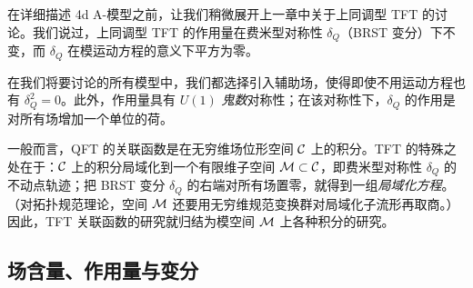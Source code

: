 在详细描述 4d A-模型之前，让我们稍微展开上一章中关于上同调型 TFT 的讨论。我们说过，上同调型 TFT 的作用量在费米型对称性 $\delta_Q$（BRST 变分）下不变，而 $\delta_Q$ 在模运动方程的意义下平方为零。


在我们将要讨论的所有模型中，我们都选择引入辅助场，使得即使不用运动方程也有 $\delta_Q^2=0$。此外，作用量具有 $U(1)$ \emph{鬼数}对称性；在该对称性下，$\delta_Q$ 的作用是对所有场增加一个单位的荷。



一般而言，QFT 的关联函数是在无穷维场位形空间 $\mathcal{C}$ 上的积分。TFT 的特殊之处在于：$\mathcal{C}$ 上的积分局域化到一个有限维子空间 $\mathcal{M}\subset\mathcal{C}$，即费米型对称性 $\delta_Q$ 的不动点轨迹；把 BRST 变分 $\delta_Q$ 的右端对所有场置零，就得到一组\emph{局域化方程}。（对拓扑规范理论，空间 $\mathcal{M}$ 还要用无穷维规范变换群对局域化子流形再取商。）因此，TFT 关联函数的研究就归结为模空间 $\mathcal{M}$ 上各种积分的研究。

\subsection{场含量、作用量与变分}

